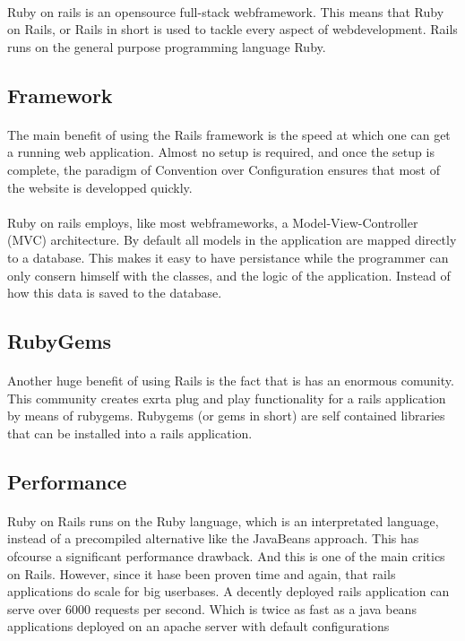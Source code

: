 \paragraph{}Ruby on rails is an opensource full-stack webframework. This means that Ruby on Rails, or Rails in short is used to tackle every aspect of webdevelopment. Rails runs on the general purpose programming language Ruby.
\subsection{Framework} %
\label{sub:Framework}
\paragraph{}The main benefit of using the Rails framework is the speed at which one can get a running web application. Almost no setup is required, and once the setup is complete, the paradigm of Convention over Configuration ensures that most of the website is developped quickly.
\paragraph{}Ruby on rails employs, like most webframeworks, a Model-View-Controller (MVC) architecture. By default all models in the application are mapped directly to a database. This makes it easy to have persistance while the programmer can only consern himself with the classes, and the logic of the application. Instead of how this data is saved to the database.
\subsection{RubyGems} %
\label{sub:RubyGems}
\paragraph{}Another huge benefit of using Rails is the fact that is has an enormous comunity. This community creates exrta plug and play functionality for a rails application by means of rubygems. Rubygems (or gems in short) are self contained libraries that can be installed into a rails application.
\subsection{Performance} %
\label{sub:subsection name}
\paragraph{}Ruby on Rails runs on the Ruby language, which is an interpretated language, instead of a precompiled alternative like the JavaBeans approach. This has ofcourse a significant performance drawback. And this is one of the main critics on Rails. However, since it hase been proven time and again, that rails applications do scale for big userbases. A decently deployed rails application can serve over 6000 requests per second. Which is twice as fast as a java beans applications deployed on an apache server with default configurations
